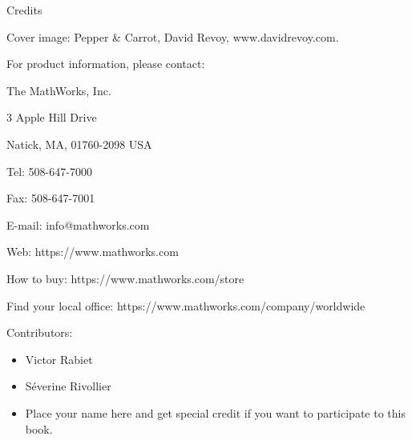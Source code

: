 \noindent 
\begin{note}
	Credits
	
	Cover image: Pepper \& Carrot, David Revoy, www.davidrevoy.com.
	
	\end{note}

\begin{mcomment}
\begin{mhelp}
For \matlabregistered{} product information, please contact:

The MathWorks, Inc.

3 Apple Hill Drive

Natick, MA, 01760-2098 USA

Tel: 508-647-7000

Fax: 508-647-7001

E-mail: info@mathworks.com

Web: https://www.mathworks.com

How to buy: https://www.mathworks.com/store

Find your local office: https://www.mathworks.com/company/worldwide
\end{mhelp}
\end{mcomment}

Contributors:

\begin{itemize}
 \item Victor Rabiet
 \item Séverine Rivollier
 \item Place your name here and get special credit if you want to participate to this book.
\end{itemize}

